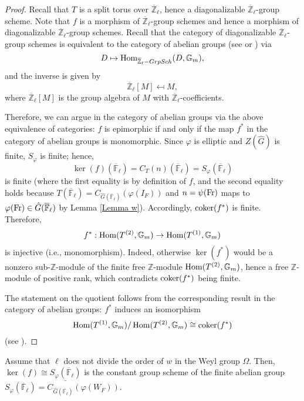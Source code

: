 \begin{proof}
	Recall that $T$ is a split torus over $\overline{\mathbb{Z}}_{\ell}$, hence a diagonalizable $\overline{\mathbb{Z}}_{\ell}$-group scheme. Note that $f$ is a morphism of $\overline{\mathbb{Z}}_{\ell}$-group schemes and hence a morphism of diagonalizable $\overline{\mathbb{Z}}_{\ell}$-group schemes. Recall that the category of diagonalizable $\overline{\mathbb{Z}}_{\ell}$-group schemes is equivalent to the category of abelian groups (see \cite[p70, Section 5]{brochard2014autour} or \cite{conrad2014reductive}) via
	$$D \mapsto \operatorname{\operatorname{Hom}}_{\overline{\mathbb{Z}}_{\ell}-GrpSch}(D, \mathbb{G}_m),$$
	and the inverse is given by 
	$$\overline{\mathbb{Z}}_{\ell}[M] \mapsfrom M,$$
	where $\overline{\mathbb{Z}}_{\ell}[M]$ is the group algebra of $M$ with $\overline{\mathbb{Z}}_{\ell}$-coefficients.
	
	Therefore, we can argue in the category of abelian groups via the above equivalence of categories: $f$ is epimorphic if and only if the map $f^*$ in the category of abelian groups is monomorphic. Since $\varphi$ is elliptic and $Z(\hat{G})$ is finite, $S_{\varphi}$ is finite; hence, 
	$$\ker(f)(\overline{\mathbb{F}}_{\ell})=C_T(n)(\overline{\mathbb{F}}_{\ell})=S_{\varphi}(\overline{\mathbb{F}}_{\ell})$$
	is finite (where the first equality is by definition of $f$, and the second equality holds because $T(\overline{\mathbb{F}}_{\ell})=C_{\hat{G}(\overline{\mathbb{F}}_{\ell})}(\varphi(I_F))$ and $n = \psi(\operatorname{Fr})$ maps to $\varphi(\operatorname{Fr}) \in \hat{G}(\overline{\mathbb{F}}_{\ell})$ by Lemma \ref{Lemma w}). Accordingly, $\operatorname{coker}(f^*)$ is finite. Therefore, 
	$$f^*:\operatorname{\operatorname{Hom}}(T^{(2)}, \mathbb{G}_m) \to \operatorname{\operatorname{Hom}}(T^{(1)}, \mathbb{G}_m)$$
	is injective (i.e., monomorphism). Indeed, otherwise $\ker(f^*)$ would be a nonzero sub-$\mathbb{Z}$-module of the finite free $\mathbb{Z}$-module $\operatorname{\operatorname{Hom}}(T^{(2)}, \mathbb{G}_m)$, hence a free $\mathbb{Z}$-module of positive rank, which contradicts $\operatorname{coker}(f^*)$ being finite.
	
	The statement on the quotient follows from the corresponding result in the category of abelian groups: $f^*$ induces an isomorphism
	$$\operatorname{\operatorname{Hom}}(T^{(1)}, \mathbb{G}_m)/\operatorname{\operatorname{Hom}}(T^{(2)}, \mathbb{G}_m) \cong \operatorname{coker}(f^*)$$
	(see \cite[p71, Subsection 5.3]{brochard2014autour}).
\end{proof}

\begin{lemma}\label{Lem ker(f)}
	Assume that $\ell$ does not divide the order of $w$ in the Weyl group $\Omega$. Then, $\ker(f) \cong \underline{S_{\varphi}(\overline{\mathbb{F}}_{\ell})}$ is the constant group scheme of the finite abelian group $S_{\varphi}(\overline{\mathbb{F}}_{\ell})=C_{\hat{G}(\overline{\mathbb{F}}_{\ell})}(\varphi(W_F))$.
\end{lemma}

